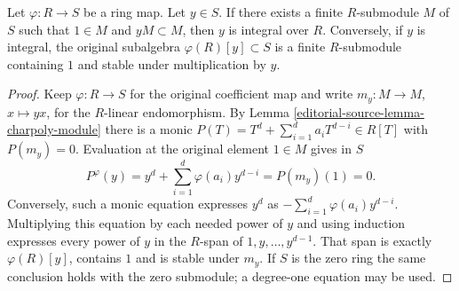 \begin{lemma}
\label{editorial-source-lemma-characterize-integral-element}
Let $\varphi : R \to S$ be a ring map. Let $y \in S$. If there exists a
finite $R$-submodule $M$ of $S$ such that $1 \in M$ and $yM \subset M$,
then $y$ is integral over $R$.
Conversely, if $y$ is integral, the original subalgebra
$\varphi(R)[y]\subset S$ is a finite $R$-submodule containing $1$
and stable under multiplication by $y$.
\end{lemma}

\begin{proof}
Keep $\varphi:R\to S$ for the original coefficient map and write
$m_y:M\to M$, $x\mapsto yx$, for the $R$-linear endomorphism.
By Lemma \ref{editorial-source-lemma-charpoly-module} there is a monic
$P(T)=T^d+\sum_{i=1}^d a_iT^{d-i}\in R[T]$ with $P(m_y)=0$.
Evaluation at the original element $1\in M$ gives in $S$
$$
P^\varphi(y)=y^d+\sum_{i=1}^d\varphi(a_i)y^{d-i}
=P(m_y)(1)=0.
$$
Conversely, such a monic equation expresses $y^d$ as
$-\sum_{i=1}^d\varphi(a_i)y^{d-i}$. Multiplying this equation by
each needed power of $y$ and using induction expresses every power
of $y$ in the $R$-span of $1,y,\ldots,y^{d-1}$.
That span is exactly $\varphi(R)[y]$, contains $1$ and is stable
under $m_y$. If $S$ is the zero ring the same conclusion holds with
the zero submodule; a degree-one equation may be used.
\end{proof}